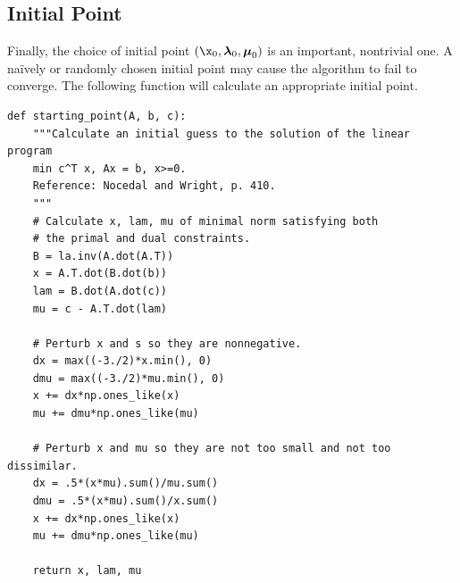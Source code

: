 \subsection*{Initial Point}
Finally, the choice of initial point $(\x_0, \Lamb_0, \Mu_0)$ is an important, nontrivial one.
A na\"{i}vely or randomly chosen initial point may cause the algorithm to fail to converge.
The following function will calculate an appropriate initial point.

\begin{lstlisting}
def starting_point(A, b, c):
    """Calculate an initial guess to the solution of the linear program
    min c^T x, Ax = b, x>=0.
    Reference: Nocedal and Wright, p. 410.
    """
    # Calculate x, lam, mu of minimal norm satisfying both
    # the primal and dual constraints.
    B = la.inv(A.dot(A.T))
    x = A.T.dot(B.dot(b))
    lam = B.dot(A.dot(c))
    mu = c - A.T.dot(lam)

    # Perturb x and s so they are nonnegative.
    dx = max((-3./2)*x.min(), 0)
    dmu = max((-3./2)*mu.min(), 0)
    x += dx*np.ones_like(x)
    mu += dmu*np.ones_like(mu)

    # Perturb x and mu so they are not too small and not too dissimilar.
    dx = .5*(x*mu).sum()/mu.sum()
    dmu = .5*(x*mu).sum()/x.sum()
    x += dx*np.ones_like(x)
    mu += dmu*np.ones_like(mu)

    return x, lam, mu
\end{lstlisting}

